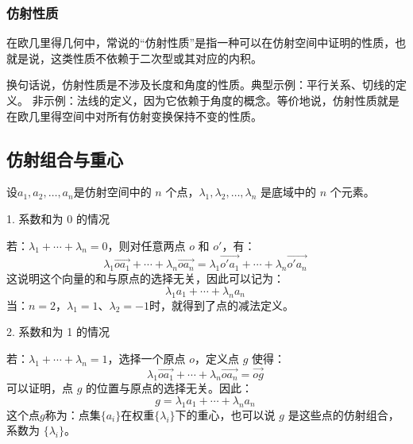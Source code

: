 \subsubsection{仿射性质}
在欧几里得几何中，常说的“仿射性质”是指一种可以在仿射空间中证明的性质，也就是说，这类性质不依赖于二次型或其对应的内积。

换句话说，仿射性质是不涉及长度和角度的性质。典型示例：平行关系、切线的定义。
非示例：法线的定义，因为它依赖于角度的概念。等价地说，仿射性质就是在欧几里得空间中对所有仿射变换保持不变的性质。
\subsection{仿射组合与重心}
设$a_1, a_2, \ldots, a_n$是仿射空间中的 $n$ 个点，$\lambda_1, \lambda_2, \ldots, \lambda_n$ 是底域中的 $n$ 个元素。

1. 系数和为 0 的情况

若：$\lambda_1 + \cdots + \lambda_n = 0$，则对任意两点 $o$ 和 $o'$，有：
$$
\lambda_1 \overrightarrow{oa_1} + \cdots + \lambda_n \overrightarrow{oa_n}
= 
\lambda_1 \overrightarrow{o'a_1} + \cdots + \lambda_n \overrightarrow{o'a_n}~
$$
这说明这个向量的和与原点的选择无关，因此可以记为：
$$
\lambda_1 a_1 + \cdots + \lambda_n a_n~
$$
当：$n = 2$，$\lambda_1 = 1$、$\lambda_2 = -1$时，就得到了点的减法定义。

2. 系数和为 1 的情况

若：$\lambda_1 + \cdots + \lambda_n = 1$，选择一个原点 $o$，定义点 $g$ 使得：
$$
\lambda_1 \overrightarrow{oa_1} + \cdots + \lambda_n \overrightarrow{oa_n}
=
\overrightarrow{og}~
$$
可以证明，点 $g$ 的位置与原点的选择无关。因此：
$$
g = \lambda_1 a_1 + \cdots + \lambda_n a_n~
$$
这个点$g$称为：点集$\{a_i\}$在权重$\{\lambda_i\}$下的重心，也可以说 $g$ 是这些点的仿射组合，系数为 $\{\lambda_i\}$。
